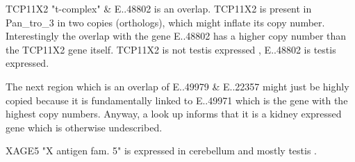 TCP11X2 "t-complex" & E..48802 is an overlap. TCP11X2 is present in Pan\_tro\_3 in two copies (orthologs), which might inflate its copy number. Interestingly the overlap with the gene E..48802 has a higher copy number than the TCP11X2 gene itself. TCP11X2 is not testis expressed \cite{ensembl}, E..48802 is testis expressed.


The next region which is an overlap of E..49979 & E..22357 might just be highly copied because it is fundamentally linked to E..49971 which is the gene with the highest copy numbers. Anyway, a look up informs that it is a kidney expressed gene which is otherwise undescribed.

XAGE5 "X antigen fam. 5" is expressed in cerebellum and mostly testis \cite{bgee_}.




% 
% 
% 
